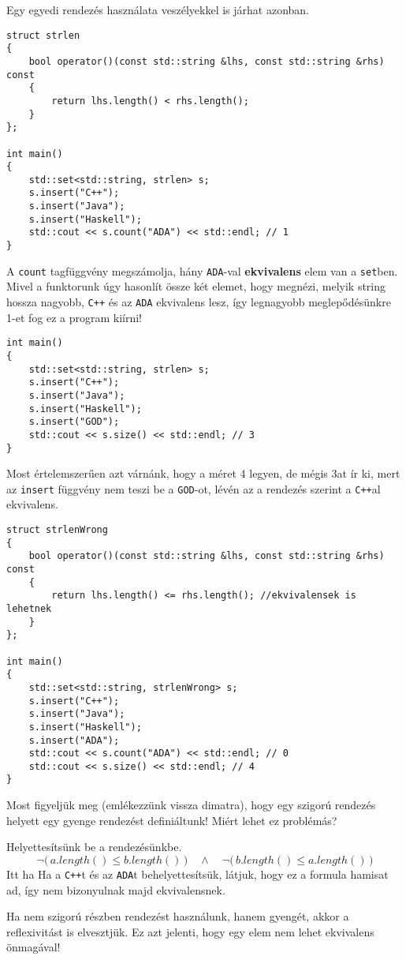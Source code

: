 \documentclass[a4paper,11.5pt,table]{article}
\begin{document}
	Egy egyedi rendezés használata veszélyekkel is járhat azonban.
	\begin{lstlisting}
struct strlen
{
	bool operator()(const std::string &lhs, const std::string &rhs) const
	{
		return lhs.length() < rhs.length();
	}
};

int main()
{
	std::set<std::string, strlen> s;
	s.insert("C++");
	s.insert("Java");
	s.insert("Haskell");
	std::cout << s.count("ADA") << std::endl; // 1
}
	\end{lstlisting}
	A \texttt{count} tagfüggvény megszámolja, hány \texttt{ADA}-val \textbf{ekvivalens} elem van a \texttt{set}ben. Mivel a funktorunk úgy hasonlít össze két elemet, hogy megnézi, melyik string hossza nagyobb, \texttt{C++} és az \texttt{ADA} ekvivalens lesz, így legnagyobb meglepődésünkre 1-et fog ez a program kiírni!
\begin{lstlisting}
int main()
{
	std::set<std::string, strlen> s;
	s.insert("C++");
	s.insert("Java");
	s.insert("Haskell");
	s.insert("GOD");
	std::cout << s.size() << std::endl; // 3
}
\end{lstlisting}
	Most értelemszerűen azt várnánk, hogy a méret 4 legyen, de mégis 3at ír ki, mert az \texttt{insert} függvény nem teszi be a \texttt{GOD}-ot, lévén az a rendezés szerint a \texttt{C++}al ekvivalens.
\begin{lstlisting}
struct strlenWrong
{
	bool operator()(const std::string &lhs, const std::string &rhs) const
	{
		return lhs.length() <= rhs.length(); //ekvivalensek is lehetnek
	}
};

int main()
{
	std::set<std::string, strlenWrong> s;
	s.insert("C++");
	s.insert("Java");
	s.insert("Haskell");
	s.insert("ADA");
	std::cout << s.count("ADA") << std::endl; // 0
	std::cout << s.size() << std::endl; // 4
}
\end{lstlisting}
	Most figyeljük meg (emlékezzünk vissza dimatra), hogy egy szigorú rendezés helyett egy gyenge rendezést definiáltunk! Miért lehet ez problémás?
	
	\smallskip
	Helyettesítsünk be a rendezésünkbe.
	\[ \neg\big(\,a.length() \leq b.length()\,\big)\quad \wedge \quad \neg\big(\,b.length() \leq a.length()\,\big) \]
	Itt ha Ha a \texttt{C++}t és az \texttt{ADA}t behelyettesítsük, látjuk, hogy ez a formula hamisat ad, így nem bizonyulnak majd ekvivalensnek.
	
	Ha nem szigorú részben rendezést használunk, hanem gyengét, akkor a reflexivitást is elvesztjük. Ez azt jelenti, hogy egy elem nem lehet ekvivalens önmagával!
	
\end{document}
